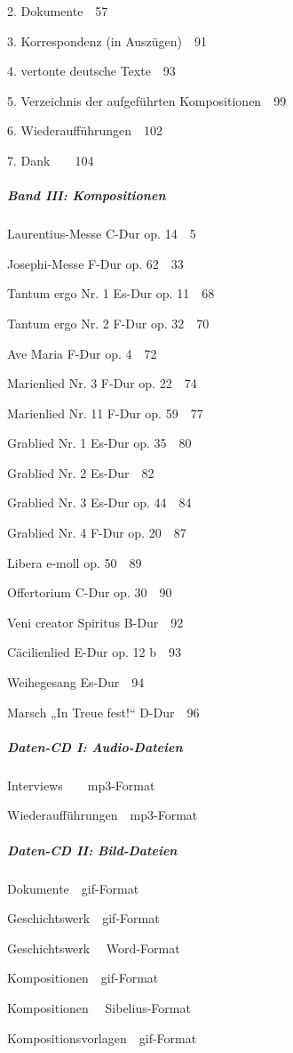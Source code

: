 \documentclass[a4paper]{article}
\begin{document}
2. Dokumente\ \ 57

3. Korrespondenz (in Auszügen)\ \ 91

4. vertonte deutsche Texte\ \ 93

5. Verzeichnis der aufgeführten Kompositionen\ \ 99

6. Wiederaufführungen\ \ 102

7. Dank\ \ \ \ 104

\subparagraph{Band III: Kompositionen}
{\textquotedbl}Laurentius{\textquotedbl}-Messe C-Dur op. 14\ \ 5

{\textquotedbl}Josephi{\textquotedbl}-Messe F-Dur op. 62\ \ 33

Tantum ergo Nr. 1 Es-Dur op. 11\ \ 68

Tantum ergo Nr. 2 F-Dur op. 32\ \ 70

Ave Maria F-Dur op. 4\ \ 72

Marienlied Nr. 3 F-Dur op. 22\ \ 74

Marienlied Nr. 11 F-Dur op. 59\ \ 77

Grablied Nr. 1 Es-Dur op. 35\ \ 80

Grablied Nr. 2 Es-Dur\ \ 82

Grablied Nr. 3 Es-Dur op. 44\ \ 84

Grablied Nr. 4 F-Dur op. 20\ \ 87

Libera e-moll op. 50\ \ 89

Offertorium C-Dur op. 30\ \ 90

Veni creator Spiritus B-Dur\ \ 92

Cäcilienlied E-Dur op. 12 b\ \ 93

Weihegesang Es-Dur\ \ 94

Marsch „In Treue fest!“ D-Dur\ \ 96

\subparagraph[Daten{}-CD I: Audio{}-Dateien]{Daten-CD I: Audio-Dateien}
Interviews\ \ \ \ mp3-Format

Wiederaufführungen\ \ mp3-Format

\subparagraph{Daten-CD II: Bild-Dateien}
Dokumente\ \ gif-Format

Geschichtswerk\ \ gif-Format

Geschichtswerk \ \ Word-Format

Kompositionen\ \ gif-Format

Kompositionen \ \ Sibelius-Format

Kompositionsvorlagen\ \ gif-Format
\end{document}
